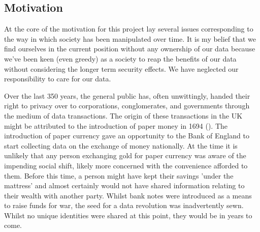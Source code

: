 \subsection{Motivation}

At the core of the motivation for this project lay several issues corresponding to the way in which society has been manipulated over time. It is my belief that we find ourselves in the current position without any ownership of our data because we've been keen (even greedy) as a society to reap the benefits of our data without considering the longer term security effects. We have neglected our responsibility to care for our data.

Over the last 350 years, the general public has, often unwittingly, handed their right to privacy over to corporations, conglomerates, and governments through the medium of data transactions. The origin of these transactions in the UK might be attributed to the introduction of paper money in 1694 (\cite{bankofengland:2016:online}). The introduction of paper currency gave an opportunity to the Bank of England to start collecting data on the exchange of money nationally. At the time it is unlikely that any person exchanging gold for paper currency was aware of the impending social shift, likely more concerned with the convenience afforded to them. Before this time, a person might have kept their savings 'under the mattress' and almost certainly would not have shared information relating to their wealth with another party. Whilst bank notes were introduced as a means to raise funds for war, the seed for a data revolution was inadvertently sewn. Whilst no unique identities were shared at this point, they would be in years to come.

